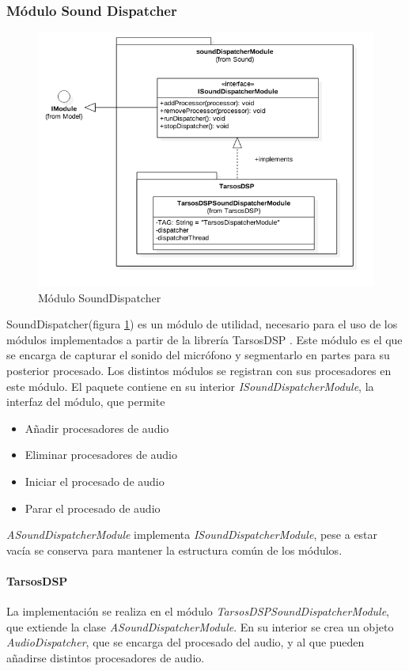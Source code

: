 \subsubsection{Módulo Sound Dispatcher}
\begin{figure}
	\centering
	\includegraphics[width=1\linewidth]{imagenes/diagramas/SoundDispatcherModule.png}
	\caption{Módulo SoundDispatcher}
	\label{fig:sound-dispatcher-module}
\end{figure}
SoundDispatcher(figura \ref{fig:sound-dispatcher-module}) es un módulo de utilidad, necesario para el uso de los módulos implementados a partir de la librería TarsosDSP \cite{six2014tarsosdsp}.
Este módulo es el que se encarga de capturar el sonido del micrófono y segmentarlo en partes para su posterior procesado. Los distintos módulos se registran con sus procesadores en este módulo.
El paquete contiene en su interior \textit{ISoundDispatcherModule}, la interfaz del módulo, que permite
\begin{itemize}
	\item Añadir procesadores de audio
	\item Eliminar procesadores de audio
	\item Iniciar el procesado de audio
	\item Parar el procesado de audio
\end{itemize}
\textit{ASoundDispatcherModule} implementa \textit{ISoundDispatcherModule}, pese a estar vacía se conserva para mantener la estructura común de los módulos.
\paragraph*{TarsosDSP\\}
La implementación se realiza en el módulo \textit{TarsosDSPSoundDispatcherModule}, que extiende la clase \textit{ASoundDispatcherModule}.
En su interior se crea un objeto \textit{AudioDispatcher}, que se encarga del procesado del audio, y al que pueden añadirse distintos procesadores de audio.

